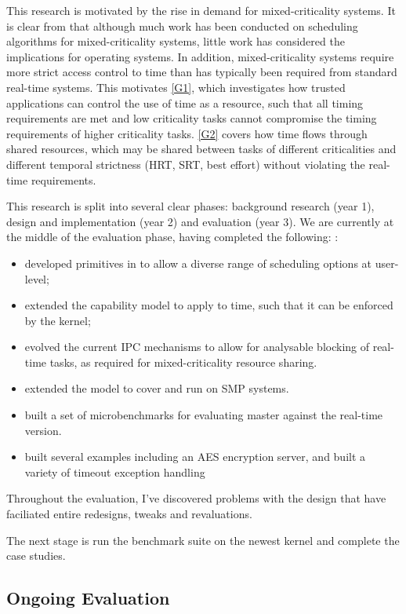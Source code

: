 This research is motivated by the rise in demand for mixed-criticality systems.
It is clear from  that although much work has been conducted on scheduling algorithms for mixed-criticality systems, little work has considered the implications for operating systems.
In addition, mixed-criticality systems require more strict access control to time than has typically been required from standard real-time systems.
This motivates \ref{G1}, which investigates how trusted applications can control the use of time as a resource, such that all timing requirements are met and low criticality tasks cannot compromise the timing requirements of higher criticality tasks.
\ref{G2} covers how time flows through shared resources, which may be shared between tasks of different criticalities and different temporal strictness (\gls{HRT}, \gls{SRT}, best effort) without violating the real-time requirements.

This research is split into several clear phases: background research (year 1), design and implementation (year 2) and evaluation (year 3).
We are currently at the middle of the evaluation phase, having completed the following:
:
\begin{itemize}
	\item developed primitives in \selfour to allow a diverse range of scheduling options at user-level;
	\item extended the \selfour capability model to apply to time, such that it can be enforced by the kernel;
	\item evolved the current \selfour \gls{IPC} mechanisms to allow for analysable blocking of real-time tasks, as required for mixed-criticality resource sharing.
        \item extended the model to cover and run on \gls{SMP} systems.
        \item built a set of microbenchmarks for evaluating \selfour master against the real-time version.
        \item built several examples including an AES encryption server, and built a variety of timeout exception handling 
\end{itemize}

Throughout the evaluation, I've discovered problems with the design that have faciliated entire redesigns, tweaks and revaluations. 

The next stage is run the benchmark suite on the newest kernel and complete the case studies.

\subsection{Ongoing Evaluation}

